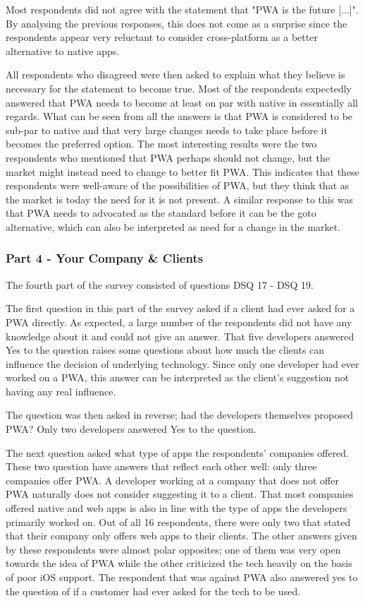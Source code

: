 \documentclass[a4paper,12pt]{article}
\begin{document}
Most respondents did not agree with the statement that "PWA is the future [...]". By analysing the previous responses, this does not come as a surprise since the respondents appear very reluctant to consider cross-platform as a better alternative to native apps.

All respondents who disagreed were then asked to explain what they believe is necessary for the statement to become true. Most of the respondents expectedly answered that PWA needs to become at least on par with native in essentially all regards. What can be seen from all the answers is that PWA is considered to be sub-par to native and that very large changes needs to take place before it becomes the preferred option. The most interesting results were the two respondents who mentioned that PWA perhaps should not change, but the market might instead need to change to better fit PWA. This indicates that these respondents were well-aware of the possibilities of PWA, but they think that as the market is today the need for it is not present. A similar response to this was that PWA needs to advocated as the standard before it can be the goto alternative, which can also be interpreted as need for a change in the market.

\subsubsection{Part 4 - Your Company \& Clients}
\label{Analysis_devSurvey_part4}
The fourth part of the survey consisted of questions DSQ 17 - DSQ 19. 

The first question in this part of the survey asked if a client had ever asked for a PWA directly. As expected, a large number of the respondents did not have any knowledge about it and could not give an answer. That five developers answered Yes to the question raises some questions about how much the clients can influence the decision of underlying technology. Since only one developer had ever worked on a PWA, this answer can be interpreted as the client's suggestion not having any real influence.

The question was then asked in reverse; had the developers themselves proposed PWA? Only two developers answered Yes to the question.

The next question asked what type of apps the respondents' companies offered. These two question have answers that reflect each other well: only three companies offer PWA. A developer working at a company that does not offer PWA naturally does not consider suggesting it to a client. That most companies offered native and web apps is also in line with the type of apps the developers primarily worked on. Out of all 16 respondents, there were only two that stated that their company only offers web apps to their clients. The other answers given by these respondents were almost polar opposites; one of them was very open towards the idea of PWA while the other criticized the tech heavily on the basis of poor iOS support. The respondent that was against PWA also answered yes to the question of if a customer had ever asked for the tech to be used.
\end{document}
